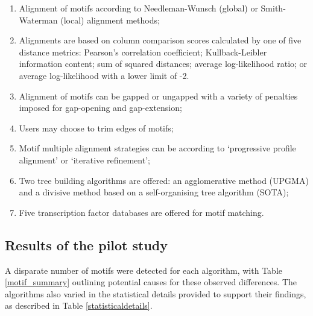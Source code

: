 \documentclass[12pt]{article}
\begin{document}
\begin{enumerate}
\item Alignment of motifs according to Needleman-Wunsch (global) or Smith-Waterman (local) alignment methods;
\item Alignments are based on column comparison scores calculated by one of five distance metrics: Pearson's correlation coefficient; Kullback-Leibler information content; sum of squared distances; average log-likelihood ratio; or average log-likelihood with a lower limit of -2.
\item Alignment of motifs can be gapped or ungapped with a variety of penalties imposed for gap-opening and gap-extension;
\item Users may choose to trim edges of motifs;
\item Motif multiple alignment strategies can be according to `progressive profile alignment' or `iterative refinement';
\item  Two tree building algorithms are offered: an agglomerative method (UPGMA) and a divisive method based on a self-organising tree algorithm (SOTA);
\item Five transcription factor databases are offered for motif matching.
\end{enumerate}
\subsection{Results of the pilot study}

A disparate number of motifs were detected for each algorithm, with Table \ref{motif_summary} outlining potential causes for these observed differences. The algorithms also varied in the statistical details provided to support their findings, as described in Table \ref{statisticaldetails}.
\end{document}
